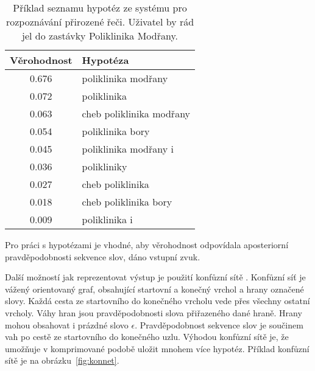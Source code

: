 \begin{table}[h]
\begin{center}
\begin{tabular}{|c|l|}
\hline
Věrohodnost & Hypotéza \\
\hline
\hline
0.676 & poliklinika modřany\\
\hline
0.072 & poliklinika\\
\hline
0.063 & cheb poliklinika modřany\\
\hline
0.054 & poliklinika bory\\
\hline
0.045 & poliklinika modřany i\\
\hline
0.036 & polikliniky\\
\hline
0.027 & cheb poliklinika\\
\hline
0.018 & cheb poliklinika bory\\
\hline
0.009 & poliklinika i\\
\hline
\end{tabular}
\end{center}
\caption{Příklad seznamu hypotéz ze systému pro rozpoznávání přirozené řeči.
Uživatel by rád jel do zastávky Poliklinika Modřany.}
\label{tab:sezhyp}
\end{table}

Pro práci s hypotézami je vhodné, aby věrohodnost odpovídala aposteriorní pravděpodobnosti sekvence slov, dáno vstupní zvuk.

Další možností jak reprezentovat výstup je použití konfůzní sítě \cite{bertoldi2005new}.
Konfůzní síť je vážený orientovaný graf, obsahující startovní a konečný vrchol a hrany označené slovy.
Každá cesta ze startovního do konečného vrcholu vede přes všechny ostatní vrcholy.
Váhy hran jsou pravděpodobnosti slova přiřazeného dané hraně.
Hrany mohou obsahovat i prázdné slovo $\epsilon$.
Pravděpodobnost sekvence slov je součinem vah po cestě ze startovního do konečného uzlu.
Výhodou konfůzní sítě je, že umožňuje v komprimované podobě uložit mnohem více hypotéz.
Příklad konfůzní sítě je na obrázku~\ref{fig:konnet}.

